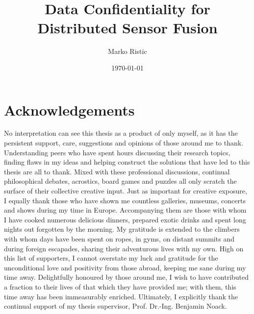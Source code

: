 \documentclass[oneside]{scrbook}
\title{Data Confidentiality for Distributed Sensor Fusion}
\author{Marko Ristic}
\date{\today}
\theoremstyle{definition}
\theoremstyle{definition}
\theoremstyle{remark}
\begin{document}
\maketitle

\frontmatter
\tableofcontents

% 
%                                     
%                                     
%                                     
% 

\chapter{Acknowledgements}
No interpretation can see this thesis as a product of only myself, as it has the persistent support, care, suggestions and opinions of those around me to thank. Understanding peers who have spent hours discussing their research topics, finding flaws in my ideas and helping construct the solutions that have led to this thesis are all to thank. Mixed with these professional discussions, continual philosophical debates, acrostics, board games and puzzles all only scratch the surface of their collective creative input. Just as important for creative exposure, I equally thank those who have shown me countless galleries, museums, concerts and shows during my time in Europe. Accompanying them are those with whom I have cooked numerous delicious dinners, prepared exotic drinks and spent long nights out forgotten by the morning. My gratitude is extended to the climbers with whom days have been spent on ropes, in gyms, on distant summits and during foreign escapades, sharing their adventurous lives with my own. High on this list of supporters, I cannot overstate my luck and gratitude for the unconditional love and positivity from those abroad, keeping me sane during my time away. Delightfully honoured by those around me, I wish to have contributed a fraction to their lives of that which they have provided me; with them, this time away has been immeasurably enriched. Ultimately, I explicitly thank the continual support of my thesis supervisor, Prof. Dr.-Ing. Benjamin Noack.

% 
%                                                                
%                                                                
%                                                                
% 
\end{document}
